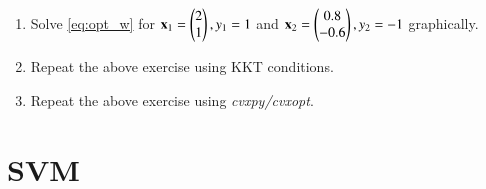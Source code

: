 \documentclass[journal,12pt,twocolumn]{IEEEtran}
\renewcommand\thesection{\arabic{section}}
\begin{document}
\begin{enumerate}[label=\thesection.\arabic*,ref=\thesection.\theenumi]
\item Solve \eqref{eq:opt_w} 
for $\mathbf{x}_1=\begin{pmatrix}2 \\ 1\end{pmatrix},y_1=1$ and 
$\mathbf{x}_2=\begin{pmatrix}0.8 \\ -0.6\end{pmatrix},y_2=-1$ graphically.

\item Repeat the above exercise using KKT conditions.
\item Repeat the above exercise using {\em cvxpy/cvxopt}.
\end{enumerate}
\section{SVM}
\end{document}
